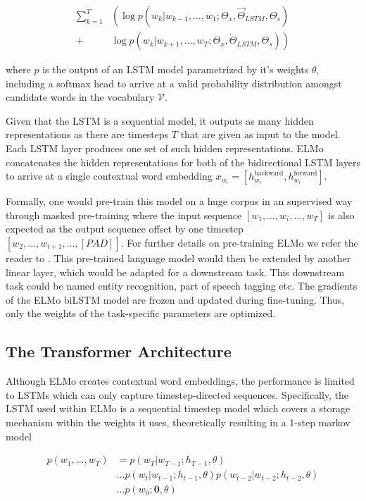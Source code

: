 \documentclass[a4paper,12pt,oneside,openright]{report}
\begin{document}
\begin{align} 
\sum_{k=1}^{T} &\left(\log p\left(w_{k} | w_{k-1}, \ldots, w_{1} ; \Theta_{x}, \vec{\Theta}_{L S T M}, \Theta_{s}\right)\right.\\
+&\left.\log p\left(w_{k} | w_{k+1}, \ldots, w_{T}; \Theta_{x}, \overleftarrow{\Theta}_{L S T M}, \Theta_{s}\right)\right) 
\end{align}

where $p$ is the output of an LSTM model parametrized by it's weights $\theta$, including a softmax head to arrive at a valid probability distribution amongst candidate words in the vocabulary $\mathcal{V}$.

Given that the LSTM is a sequential model, it outputs as many hidden representations as there are timesteps $T$ that are given as input to the model. 
Each LSTM layer produces one set of such hidden representations.
ELMo concatenates the hidden representations for both of the bidirectional LSTM layers to arrive at a single contextual word embedding $x_{w_i} = [h^\text{backward}_{w_i}, h^\text{forward}_{w_i}]$.


Formally, one would pre-train this model on a huge corpus in an supervised way through masked pre-training where the input sequence $[w_1, \ldots , w_i, \ldots, w_T]$ is also expected as the output sequence offset by one timestep $[w_2, \ldots, w_{i+1}, \ldots , [PAD] ]$.
For further details on pre-training ELMo we refer the reader to \cite{jozefowicz16}.
This pre-trained language model would then be extended by another linear layer, which would be adapted for a downstream task.
This downstream task could be named entity recognition, part of speech tagging etc.
The gradients of the ELMo biLSTM model are frozen and updated during fine-tuning.
Thus, only the weights of the task-specific parameters are optimized. 

\subsection{The Transformer Architecture}

Although ELMo creates contextual word embeddings, the performance is limited to LSTMs which can only capture timestep-directed sequences.
Specifically, the LSTM used within ELMo is a sequential timestep model which covers a storage mechanism within the weights it uses, theoretically resulting in a 1-step markov model

\begin{align}
p(w_1, \ldots, w_T) &= p(w_T | w_{T-1}; h_{T-1}, \theta) \nonumber  \\
& \ldots p(w_t | w_{t-1}; h_{t-1}, \theta) p(w_{t-2} | w_{t-2}; h_{t-2}, \theta) \nonumber \\
& \ldots p(w_0 ; \mathbf{0}, \theta) 
\end{align}
\end{document}
